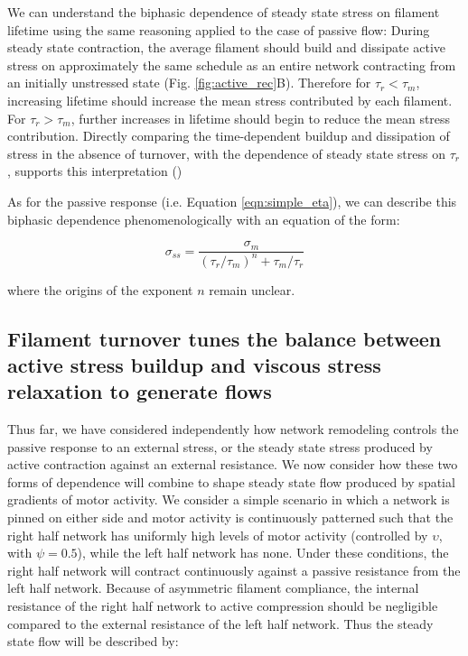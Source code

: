 We can understand the biphasic dependence of steady state stress on filament lifetime using the same reasoning applied to the case of passive flow:   During steady state contraction, the average filament should build and dissipate active stress on approximately the same schedule as an entire network contracting from an initially unstressed state (Fig. \ref{fig:active_rec}B). Therefore for $\tau_r < \tau_m$, increasing lifetime should increase the mean stress contributed by each filament. For $\tau_r > \tau_m$, further increases in lifetime should begin to reduce the mean stress contribution. Directly comparing the time-dependent buildup and dissipation of stress in the absence of turnover, with the dependence of steady state stress on $\tau_r$, supports this interpretation ()  


As for the passive response (i.e. Equation \ref{eqn:simple_eta}), we can describe this biphasic dependence phenomenologically with an equation of the form:

\begin{equation}
	\label{eqn:simple_sigma}
	\sigma_{ss} = \frac{\sigma_m}{(\tau_r/\tau_m)^n+\tau_m/\tau_r}  
\end{equation}

where the origins of the exponent $n$ remain unclear.




\subsection{Filament turnover tunes the balance between active stress buildup and viscous stress relaxation to generate flows}

Thus far, we have considered independently how network remodeling controls the passive response to an external stress, or the steady state stress produced by active contraction against an external resistance. We now consider how these two forms of dependence will combine to shape steady state flow produced by spatial gradients of motor activity. We consider a simple scenario in which a network is pinned on either side and motor activity is continuously patterned such that the right half network has uniformly high levels of motor activity (controlled by $\upsilon$, with $\psi = 0.5$), while the left half network has none. Under these conditions, the right half network will contract continuously against a passive resistance from the left half network.  Because of asymmetric filament compliance, the internal resistance of the right half network to active compression should be negligible compared to the external resistance of the left half network.  Thus the steady state flow will be described by:

